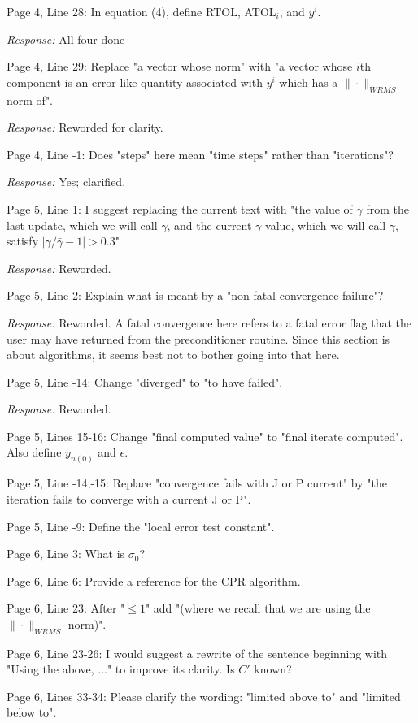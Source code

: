 \documentclass[12pt]{letter}
\begin{document}
Page 4, Line 28: In equation (4), define RTOL, ATOL$_i$, and $y^i$.

{\em Response:} All four done

Page 4, Line 29: Replace "a vector whose norm" with "a vector whose $i$th
component is an error-like quantity associated with $y^i$ which has a
$\|\cdot\|_{WRMS}$ norm of".

{\em Response:} Reworded for clarity.

Page 4, Line -1: Does "steps" here mean "time steps" rather than "iterations"?

{\em Response:} Yes; clarified.

Page 5, Line 1: I suggest replacing the current text with "the value
of $\gamma$ from the last update, which we will call $\bar{\gamma}$,
and the current $\gamma$ value, which we will call $\gamma$, satisfy
$|\gamma/\bar{\gamma} - 1| > 0.3 $"

{\em Response:} Reworded.

Page 5, Line 2: Explain what is meant by a "non-fatal convergence failure"?

{\em Response:} Reworded.  A fatal convergence here refers to a fatal
error flag that the user may have returned from the preconditioner
routine.  Since this section is about algorithms, it seems best not to
bother going into that here.

Page 5, Line -14: Change "diverged" to "to have failed".

{\em Response:} Reworded.

Page 5, Lines 15-16: Change "final computed value" to "final iterate
computed". Also define $y_{n(0)}$ and $\epsilon$.

Page 5, Line -14,-15: Replace "convergence fails with J or P current" by
"the iteration fails to converge with a current J or P".

Page 5, Line -9: Define the "local error test constant".

Page 6, Line 3: What is $\sigma_ 0$?

Page 6, Line 6: Provide a reference for the CPR algorithm.

Page 6, Line 23: After "$ \leq 1$" add "(where we recall that we are
using the $\|\cdot\|_{WRMS}$ norm)".

Page 6, Line 23-26: I would suggest a rewrite of the sentence beginning
with "Using the above, ..."  to improve its clarity. Is $C'$ known?

Page 6, Lines 33-34: Please clarify the wording: "limited above to" and
"limited below to".
\end{document}
